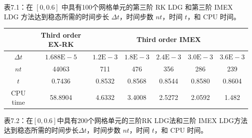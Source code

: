 表7.1：在 $[0,0.6]$ 中具有100个网格单元的第三阶 RK LDG 和第三阶 IMEX LDG 方法达到稳态所需的时间步长 $\Delta t$，时间步数 $n t$，时间 $t$，和 CPU 时间。

\begin{center}
    \begin{tabular}{|c|c|c|c|c|c|c|}
        \hline
                   & Third order EX-RK    & \multicolumn{5}{|c|}{Third order IMEX}                                                                                     \\
        \hline
        $\Delta t$ & $1.688 \mathrm{E}-5$ & $1.2 \mathrm{E}-3$                     & $1.8 \mathrm{E}-3$ & $2.4 \mathrm{E}-3$ & $3.0 \mathrm{E}-3$ & $3.6 \mathrm{E}-3$ \\
        \hline
        $n t$      & 44063                & 711                                    & 476                & 356                & 286                & 239                \\
        \hline
        $t$        & 0.7436               & 0.8532                                 & 0.8568             & 0.8544             & 0.8580             & 0.8604             \\
        \hline
        CPU time   & 58.8904              & 4.6332                                 & 3.4008             & 2.5272             & 2.0592             & 1.482              \\
        \hline
    \end{tabular}
\end{center}

表7.2：在$[0,0.6]$中具有200个网格单元的三阶RK LDG法和三阶 IMEX LDG方法达到稳态所需的时间步长$\Delta t$，时间步数 $n t$，时间 $t$，和 CPU 时间。

